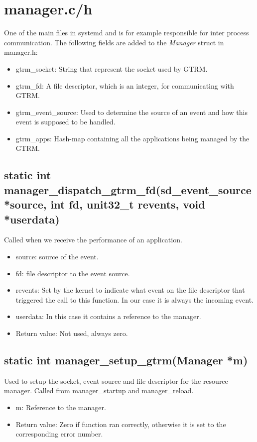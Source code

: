 \documentclass[nobiblatex]{LTHthesis}
\begin{document}
\section{manager.c/h}
One of the main files in systemd and is for example responsible for inter process communication. The following fields are added to the \emph{Manager} struct in manager.h:
\begin{itemize}
\item gtrm\_socket: String that represent the socket used by GTRM.
\item gtrm\_fd: A file descriptor, which is an integer, for communicating with GTRM.
\item gtrm\_event\_source: Used to determine the source of an event and how this event is supposed to be handled.
\item gtrm\_apps: Hash-map containing all the applications being managed by the GTRM.
\end{itemize}



\subsection{static int manager\_dispatch\_gtrm\_fd(sd\_event\_source *source, int fd, unit32\_t revents, void *userdata)}
Called when we receive the performance of an application.
\begin{itemize}
\item source: source of the event.
\item fd: file descriptor to the event source.
\item revents: Set by the kernel to indicate what event on the file descriptor that triggered the call to this function. In our case it is always the incoming event.
\item userdata: In this case it contains a reference to the manager.
\item Return value: Not used, always zero.
\end{itemize}

\subsection{static int manager\_setup\_gtrm(Manager *m)}
Used to setup the socket, event source and file descriptor for the resource manager. Called from manager\_startup and manager\_reload.
\begin{itemize}
\item m: Reference to the manager.
\item Return value: Zero if function ran correctly, otherwise it is set to the corresponding error number.
\end{itemize}
\end{document}
